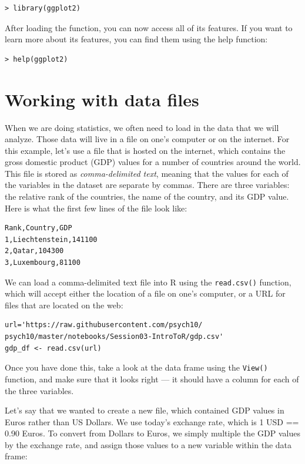 \documentclass[12pt,]{book}
\begin{document}
\begin{verbatim}
> library(ggplot2)
\end{verbatim}

After loading the function, you can now access all of its features. If you want to learn more about its features, you can find them using the help function:

\begin{verbatim}
> help(ggplot2)
\end{verbatim}

\hypertarget{working-with-data-files}{%
\section{Working with data files}\label{working-with-data-files}}

When we are doing statistics, we often need to load in the data that we will analyze. Those data will live in a file on one's computer or on the internet. For this example, let's use a file that is hosted on the internet, which contains the gross domestic product (GDP) values for a number of countries around the world. This file is stored as \emph{comma-delimited text}, meaning that the values for each of the variables in the dataset are separate by commas. There are three variables: the relative rank of the countries, the name of the country, and its GDP value. Here is what the first few lines of the file look like:

\begin{verbatim}
Rank,Country,GDP
1,Liechtenstein,141100
2,Qatar,104300
3,Luxembourg,81100
\end{verbatim}

We can load a comma-delimited text file into R using the \texttt{read.csv()} function, which will accept either the location of a file on one's computer, or a URL for files that are located on the web:

\begin{verbatim}
url='https://raw.githubusercontent.com/psych10/
psych10/master/notebooks/Session03-IntroToR/gdp.csv'
gdp_df <- read.csv(url)
\end{verbatim}

Once you have done this, take a look at the data frame using the \texttt{View()} function, and make sure that it looks right --- it should have a column for each of the three variables.

Let's say that we wanted to create a new file, which contained GDP values in Euros rather than US Dollars. We use today's exchange rate, which is 1 USD == 0.90 Euros. To convert from Dollars to Euros, we simply multiple the GDP values by the exchange rate, and assign those values to a new variable within the data frame:
\end{document}
